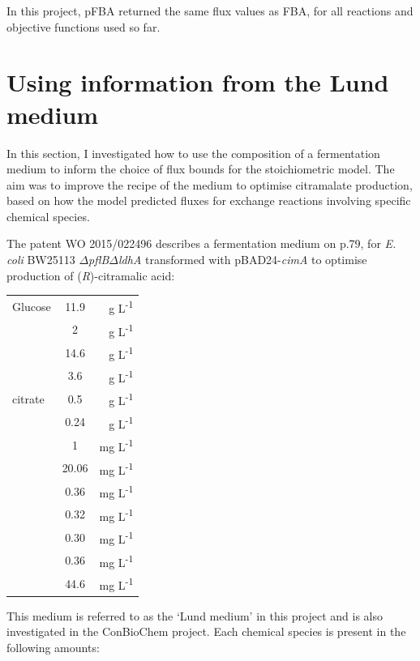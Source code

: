 \documentclass[parskip=full, numbers=noenddot]{scrreprt}
\begin{document}
  In this project, pFBA returned the same flux values as FBA, for all reactions and objective functions used so far.

\section{Using information from the Lund medium}
\label{sec:lund}

In this section, I investigated how to use the composition of a fermentation medium to inform the choice of flux bounds for the stoichiometric model. The aim was to improve the recipe of the medium to optimise citramalate production, based on how the model predicted fluxes for exchange reactions involving specific chemical species.

The patent WO 2015/022496 \citep{eastham_process_2015} describes a fermentation medium on p.79, for \emph{E. coli} BW25113 $\Delta$\emph{pflB}$\Delta$\emph{ldhA} transformed with pBAD24-\emph{cimA} to optimise production of (\emph{R})-citramalic acid:

\begin{center}
\begin{tabular}{lSr}
  Glucose & 11.9 & g L\textsuperscript{-1}\\
   & 2 & g L\textsuperscript{-1}\\
   & 14.6 & g L\textsuperscript{-1}\\
   & 3.6 & g L\textsuperscript{-1}\\
   citrate & 0.5 & g L\textsuperscript{-1}\\
   & 0.24 & g L\textsuperscript{-1}\\
   & 1 & mg L\textsuperscript{-1}\\
   & 20.06 & mg L\textsuperscript{-1}\\
   & 0.36 & mg L\textsuperscript{-1}\\
   & 0.32 & mg L\textsuperscript{-1}\\
   & 0.30 & mg L\textsuperscript{-1}\\
   & 0.36 & mg L\textsuperscript{-1}\\
   & 44.6 & mg L\textsuperscript{-1}                             
\end{tabular}
\end{center}

This medium is referred to as the `Lund medium' in this project and is also investigated in the ConBioChem project. Each chemical species is present in the following amounts:
\end{document}
